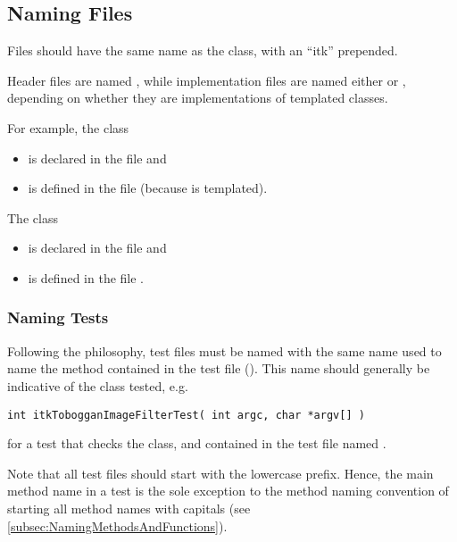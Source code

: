 \subsection{Naming Files}
\label{subsec:NamingFiles}

Files should have the same name as the class, with an ``itk'' prepended.

Header files are named , while implementation files are named either
 or , depending on whether they are implementations of
templated classes.

For example, the class 
\begin{itemize}
\item is declared in the file  and
\item is defined in the file  (because 
is templated).
\end{itemize}

The class 
\begin{itemize}
\item is declared in the file and
\item is defined in the file .
\end{itemize}


\subsubsection{Naming Tests}
\label{subsubsec:NamingTests}

Following the  philosophy, test files must be named with
the same name used to name the  method contained in the test file
(). This name should generally be indicative of the class tested,
e.g.
\small
\begin{verbatim}
int itkTobogganImageFilterTest( int argc, char *argv[] )
\end{verbatim}
\normalsize

for a test that checks the  class, and contained
in the test file named .

Note that all test files should start with the lowercase  prefix.
Hence, the main method name in a test is the sole exception to the method naming
convention of starting all method names with capitals (see
\ref{subsec:NamingMethodsAndFunctions}).

